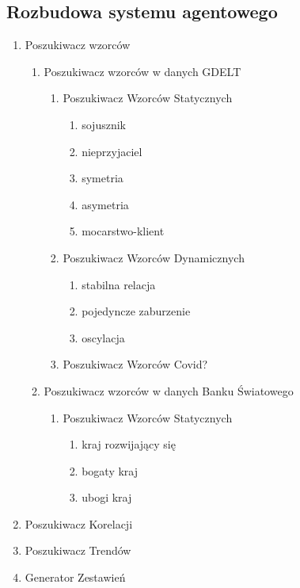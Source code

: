\documentclass[11pt]{report}
\begin{document}
    \subsection{Rozbudowa systemu agentowego}
    \begin{enumerate}
        \item Poszukiwacz wzorców
        \begin{enumerate}
            \item Poszukiwacz wzorców w danych GDELT
            \begin{enumerate}
                \item Poszukiwacz Wzorców Statycznych
                \begin{enumerate}
                    \item sojusznik
                    \item nieprzyjaciel
                    \item symetria
                    \item asymetria
                    \item mocarstwo-klient
                \end{enumerate}
                \item Poszukiwacz Wzorców Dynamicznych
                \begin{enumerate}
                    \item stabilna relacja
                    \item pojedyncze zaburzenie
                    \item oscylacja
                \end{enumerate}
                \item Poszukiwacz Wzorców Covid?
            \end{enumerate}
            \item Poszukiwacz wzorców w danych Banku Światowego
            \begin{enumerate}
                \item Poszukiwacz Wzorców Statycznych
                \begin{enumerate}
                    \item kraj rozwijający się
                    \item bogaty kraj
                    \item ubogi kraj
                \end{enumerate}
            \end{enumerate}
        \end{enumerate}
        \item Poszukiwacz Korelacji
        \item Poszukiwacz Trendów
        \item Generator Zestawień
    \end{enumerate}
\end{document}
